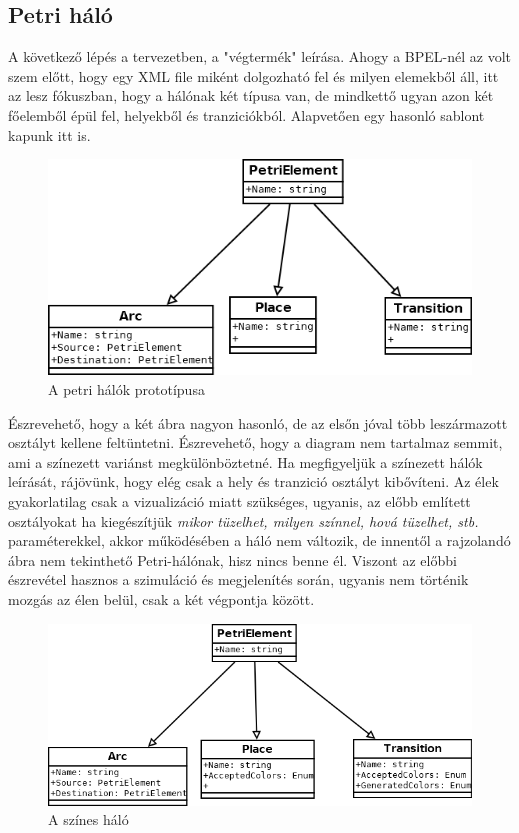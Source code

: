 \subsection{Petri háló}
A következő lépés a tervezetben, a "végtermék" leírása. Ahogy a BPEL-nél az volt szem előtt, hogy egy XML file miként dolgozható fel és milyen elemekből áll, itt az lesz fókuszban, hogy a hálónak két típusa van, de mindkettő ugyan azon két főelemből épül fel, helyekből és tranziciókból. Alapvetően egy hasonló sablont kapunk itt is.
\begin{figure}[h!]
\centering
\includegraphics[scale=0.5]{images/petriClass.png}
\caption{A petri hálók prototípusa}
\label{fig:petriclass}
\end{figure}

Észrevehető, hogy a két ábra nagyon hasonló, de az elsőn jóval több leszármazott osztályt kellene feltüntetni. Észrevehető, hogy a diagram nem tartalmaz semmit, ami a színezett variánst megkülönböztetné. Ha megfigyeljük a színezett hálók leírását, rájövünk, hogy elég csak a hely és tranzició osztályt kibővíteni. Az élek gyakorlatilag csak a vizualizáció miatt szükséges, ugyanis, az előbb említett osztályokat ha kiegészítjük \emph{mikor tüzelhet, milyen színnel, hová tüzelhet, stb. } paraméterekkel, akkor működésében a háló nem változik, de innentől a rajzolandó ábra nem tekinthető Petri-hálónak, hisz nincs benne él. Viszont az előbbi észrevétel hasznos a szimuláció és megjelenítés során, ugyanis nem történik mozgás az élen belül, csak a két végpontja között. 

\begin{figure}[h!]
\centering
\includegraphics[scale=0.5]{images/PentC.png}
\caption{A színes háló}
\label{fig:colornet}
\end{figure}

